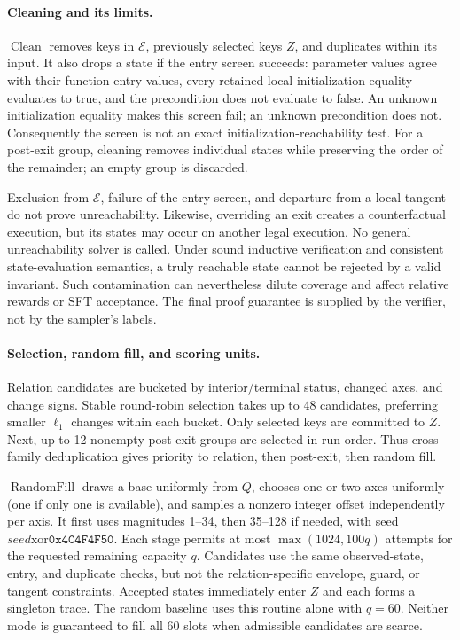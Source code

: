 \paragraph{Cleaning and its limits.}
\(\operatorname{Clean}\) removes keys in \(\mathcal E\), previously selected
keys \(Z\), and duplicates within its input.  It also drops a state if the
entry screen succeeds: parameter values agree with their function-entry
values, every retained local-initialization equality evaluates to true, and
the precondition does not evaluate to false.  An unknown initialization
equality makes this screen fail; an unknown precondition does not.
Consequently the screen is not an exact initialization-reachability test.
For a post-exit group, cleaning removes individual states while preserving
the order of the remainder; an empty group is discarded.

Exclusion from \(\mathcal E\), failure of the entry screen, and departure
from a local tangent do not prove unreachability.  Likewise, overriding an
exit creates a counterfactual execution, but its states may occur on another
legal execution.  No general unreachability solver is called.  Under sound
inductive verification and consistent state-evaluation semantics, a truly
reachable state cannot be rejected by a valid invariant.  Such contamination
can nevertheless dilute coverage and affect relative rewards or SFT
acceptance.  The final proof guarantee is supplied by the verifier, not by
the sampler's labels.

\paragraph{Selection, random fill, and scoring units.}
Relation candidates are bucketed by interior/terminal status, changed axes,
and change signs.  Stable round-robin selection takes up to 48 candidates,
preferring smaller \(\ell_1\) changes within each bucket.  Only selected keys
are committed to \(Z\).  Next, up to 12 nonempty post-exit groups are selected
in run order.  Thus cross-family deduplication gives priority to relation,
then post-exit, then random fill.

\(\operatorname{RandomFill}\) draws a base uniformly from \(Q\), chooses
one or two axes uniformly (one if only one is available), and samples a
nonzero integer offset independently per axis.  It first uses magnitudes
1--34, then 35--128 if needed, with seed \(\mathit{seed}\mathbin{\mathrm{xor}}
\mathtt{0x4C4F4F50}\).  Each stage permits at most
\(\max(1024,100q)\) attempts for the requested remaining capacity \(q\).
Candidates use the same observed-state, entry, and duplicate checks, but not
the relation-specific envelope, guard, or tangent constraints.  Accepted
states immediately enter \(Z\) and each forms a singleton trace.  The random
baseline uses this routine alone with \(q=60\).  Neither mode is guaranteed
to fill all 60 slots when admissible candidates are scarce.

